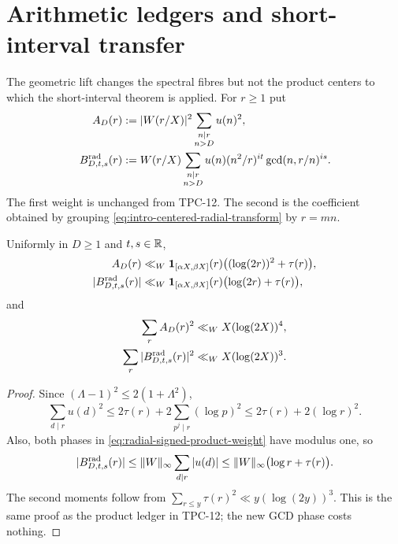 \section{Arithmetic ledgers and short-interval transfer}
\label{sec:arithmetic-transfer}

The geometric lift changes the spectral fibres but not the product
centers to which the short-interval theorem is applied.  For $r\geq1$
put
\begin{align}
 A_D(r)
 &:={}|W(r/X)|^2
 \sum_{\substack{n\mid r\\n>D}}u(n)^2,
 \label{eq:product-diagonal-weight}\\
 B^{\mathrm{rad}}_{D,t,s}(r)
 &:={}W(r/X)
 \sum_{\substack{n\mid r\\n>D}}
 u(n)(n^2/r)^{it}
 \gcd(n,r/n)^{is}.
 \label{eq:radial-signed-product-weight}
\end{align}
The first weight is unchanged from TPC-12.  The second is the coefficient
obtained by grouping \eqref{eq:intro-centered-radial-transform} by
$r=mn$.

\begin{lemma}
\label{lem:radial-product-ledgers}
Uniformly in $D\geq1$ and $t,s\in\mathbb R$,
\begin{align}
 A_D(r)&\ll_W\mathbf 1_{[\alpha X,\beta X]}(r)
 \bigl((\log(2r))^2+\tau(r)\bigr),
 \label{eq:A-pointwise}\\
 |B^{\mathrm{rad}}_{D,t,s}(r)|
 &\ll_W\mathbf 1_{[\alpha X,\beta X]}(r)
 \bigl(\log(2r)+\tau(r)\bigr),
 \label{eq:B-radial-pointwise}
\end{align}
and
\begin{align}
 \sum_rA_D(r)^2&\ll_WX(\log(2X))^4,
 \label{eq:A-second-moment}\\
 \sum_r|B^{\mathrm{rad}}_{D,t,s}(r)|^2
 &\ll_WX(\log(2X))^3.
 \label{eq:B-radial-second-moment}
\end{align}
\end{lemma}

\begin{proof}
Since $(\Lambda-1)^2\leq2(1+\Lambda^2)$,
\[
 \sum_{d\mid r}u(d)^2
 \leq2\tau(r)+2\sum_{p^j\mid r}(\log p)^2
 \leq2\tau(r)+2(\log r)^2.
\]
Also, both phases in \eqref{eq:radial-signed-product-weight} have modulus
one, so
\[
 |B^{\mathrm{rad}}_{D,t,s}(r)|
 \leq\|W\|_\infty\sum_{d\mid r}|u(d)|
 \leq\|W\|_\infty\bigl(\log r+\tau(r)\bigr).
\]
The second moments follow from
$\sum_{r\leq y}\tau(r)^2\ll y(\log(2y))^3$.  This is the same proof as
the product ledger in TPC-12; the new GCD phase costs nothing.
\end{proof}

